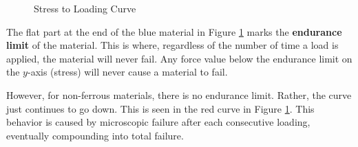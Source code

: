 \documentclass[12pt]{article}
\begin{document}
\begin{figure}[H]
  \centering
  
  \caption{Stress to Loading Curve}
  \label{fig:021}
\end{figure}

The flat part at the end of the blue material in Figure \ref{fig:021} marks the \textbf{endurance limit} of the material. This is where, regardless of the number of time a load is applied, the material will never fail. Any force value below the endurance limit on the $y$-axis (stress) will never cause a material to fail.

However, for non-ferrous materials, there is no endurance limit. Rather, the curve just continues to go down. This is seen in the red curve in Figure \ref{fig:021}. This behavior is caused by microscopic failure after each consecutive loading, eventually compounding into total failure.
\end{document}
